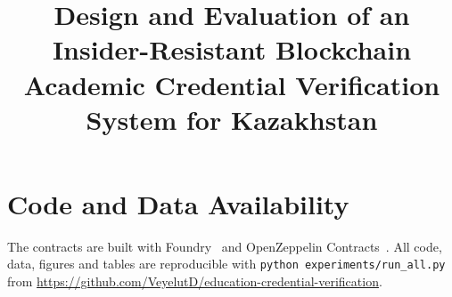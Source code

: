 \documentclass[conference]{IEEEtran}
\begin{document}
\title{Design and Evaluation of an Insider-Resistant Blockchain Academic Credential Verification System for Kazakhstan}

\author{
}

\maketitle











\section*{Code and Data Availability}
The contracts are built with Foundry~\cite{foundry,forgestd} and OpenZeppelin Contracts~\cite{openzeppelin2024}.
All code, data, figures and tables are reproducible with
\texttt{python experiments/run\_all.py} from
\url{https://github.com/VeyelutD/education-credential-verification}.



\end{document}
